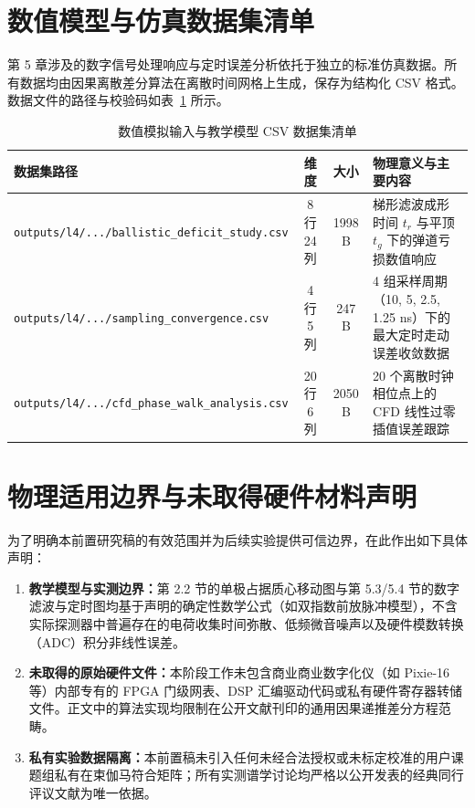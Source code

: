 \section{数值模型与仿真数据集清单}\label{sec:appF-datasets}

第 5 章涉及的数字信号处理响应与定时误差分析依托于独立的标准仿真数据。所有数据均由因果离散差分算法在离散时间网格上生成，保存为结构化 CSV 格式。数据文件的路径与校验码如表~\ref{tab:appF-csv} 所示。

\begin{table}[htbp]
\centering
\small
\caption{数值模拟输入与教学模型 CSV 数据集清单}\label{tab:appF-csv}
\begin{tabularx}{\textwidth}{p{6.5cm}ccp{5.5cm}}
\toprule
数据集路径 & 维度 & 大小 & 物理意义与主要内容 \\
\midrule
\texttt{outputs/l4/.../ballistic\_deficit\_study.csv} & 8行24列 & 1998 B & 梯形滤波成形时间 $t_r$ 与平顶 $t_g$ 下的弹道亏损数值响应 \\
\texttt{outputs/l4/.../sampling\_convergence.csv} & 4行5列 & 247 B & 4 组采样周期（10, 5, 2.5, 1.25 ns）下的最大定时走动误差收敛数据 \\
\texttt{outputs/l4/.../cfd\_phase\_walk_analysis.csv} & 20行6列 & 2050 B & 20 个离散时钟相位点上的 CFD 线性过零插值误差跟踪 \\
\bottomrule
\end{tabularx}
\end{table}

\section{物理适用边界与未取得硬件材料声明}\label{sec:appF-boundaries}

为了明确本前置研究稿的有效范围并为后续实验提供可信边界，在此作出如下具体声明：
\begin{enumerate}[label=(\arabic*),leftmargin=2em]
    \item \textbf{教学模型与实测边界：}第 2.2 节的单极占据质心移动图与第 5.3/5.4 节的数字滤波与定时图均基于声明的确定性数学公式（如双指数前放脉冲模型），不含实际探测器中普遍存在的电荷收集时间弥散、低频微音噪声以及硬件模数转换（ADC）积分非线性误差。
    \item \textbf{未取得的原始硬件文件：}本阶段工作未包含商业商业数字化仪（如 Pixie-16 等）内部专有的 FPGA 门级网表、DSP 汇编驱动代码或私有硬件寄存器转储文件。正文中的算法实现均限制在公开文献刊印的通用因果递推差分方程范畴。
    \item \textbf{私有实验数据隔离：}本前置稿未引入任何未经合法授权或未标定校准的用户课题组私有在束伽马符合矩阵；所有实测谱学讨论均严格以公开发表的经典同行评议文献为唯一依据。
\end{enumerate}

